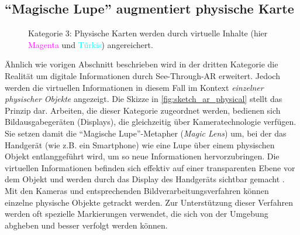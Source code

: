 \subsection{\enquote{Magische Lupe} augmentiert physische Karte}
\begin{figure}[h]
    \centering
    \caption{Kategorie 3: Physische Karten werden durch virtuelle Inhalte (hier \textcolor{magenta}{Magenta} und \textcolor{cyan}{Türkis}) angereichert.}
    \label{fig:sketch_ar_physical}
\end{figure}

Ähnlich wie vorigen Abschnitt beschrieben wird in der dritten Kategorie die Realität um digitale Informationen durch See-Through-AR erweitert.
Jedoch werden die virtuellen Informationen in diesem Fall im Kontext \emph{einzelner physischer Objekte} angezeigt.
Die Skizze in \autoref{fig:sketch_ar_physical} stellt das Prinzip dar.
Arbeiten, die dieser Kategorie zugeordnet werden, bedienen sich Bildausgabegeräten (Displays), die gleichzeitig über Kameratechnologie verfügen.
Sie setzen damit die \enquote{Magische Lupe}-Metapher (\emph{Magic Lens}) um, bei der das Handgerät (wie z.B. ein Smartphone) wie eine Lupe über einem physischen Objekt entlanggeführt wird, um so neue Informationen hervorzubringen.
Die virtuellen Informationen befinden sich effektiv auf einer transparenten Ebene vor dem Objekt und werden durch das Display des Handgeräts sichtbar gemacht \parencite{Bier1994}.
Mit den Kameras und entsprechenden Bildverarbeitungsverfahren können einzelne physische Objekte getrackt werden.
Zur Unterstützung dieser Verfahren werden oft spezielle Markierungen verwendet, die sich von der Umgebung abgheben und besser verfolgt werden können.

